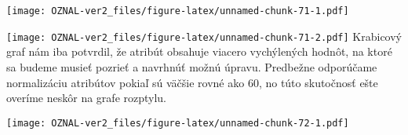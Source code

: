 \documentclass[
]{article}
\newenvironment{Shaded}{\begin{snugshade}}{\end{snugshade}}
\newcommand{\AttributeTok}[1]{\textcolor[rgb]{0.77,0.63,0.00}{#1}}
\newcommand{\ConstantTok}[1]{\textcolor[rgb]{0.00,0.00,0.00}{#1}}
\newcommand{\DecValTok}[1]{\textcolor[rgb]{0.00,0.00,0.81}{#1}}
\newcommand{\FunctionTok}[1]{\textcolor[rgb]{0.00,0.00,0.00}{#1}}
\newcommand{\NormalTok}[1]{#1}
\newcommand{\SpecialCharTok}[1]{\textcolor[rgb]{0.00,0.00,0.00}{#1}}
\newcommand{\StringTok}[1]{\textcolor[rgb]{0.31,0.60,0.02}{#1}}
\begin{document}
\begin{Shaded}
\end{Shaded}

\texttt{[image: OZNAL-ver2\_files/figure-latex/unnamed-chunk-71-1.pdf]}

\begin{Shaded}
\end{Shaded}

\texttt{[image: OZNAL-ver2\_files/figure-latex/unnamed-chunk-71-2.pdf]}
Krabicový graf nám iba potvrdil, že atribút obsahuje viacero vychýlených
hodnôt, na ktoré sa budeme musieť pozrieť a navrhnúť možnú úpravu.
Predbežne odporúčame normalizáciu atribútov pokiaľ sú väčšie rovné ako
60, no túto skutočnosť ešte overíme neskôr na grafe rozptylu.

\begin{Shaded}
\end{Shaded}

\texttt{[image: OZNAL-ver2\_files/figure-latex/unnamed-chunk-72-1.pdf]}

\begin{Shaded}
\end{Shaded}
\end{document}
